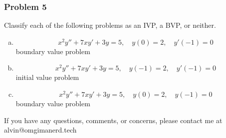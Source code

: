\documentclass{math}
\begin{document}
\subsubsection*{Problem 5}
Classify each of the following problems as an IVP, a BVP, or neither.
\begin{enumerate}[(a)]
  \item \[ x^2y''+7xy'+3y = 5, \quad y(0) = 2, \quad y'(-1) = 0 \]
    boundary value problem
  \item \[ x^2y''+7xy'+3y = 5, \quad y(-1) = 2, \quad y'(-1) = 0 \]
    initial value problem
  \item \[ x^2y''+7xy'+3y = 5, \quad y(0) = 2, \quad y(-1) = 0 \]
    boundary value problem
\end{enumerate}

\begin{center}
  If you have any questions, comments, or concerns, please contact me at
  alvin@omgimanerd.tech
\end{center}
\end{document}
